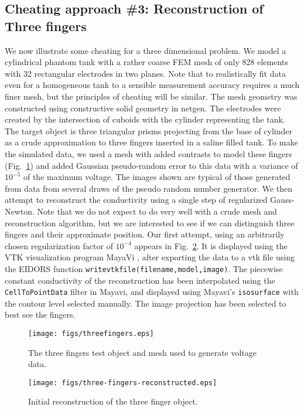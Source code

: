 \documentclass[12pt]{iopart}
\begin{document}
\subsection{
Cheating approach \#3:
     Reconstruction of Three fingers
}
We now illustrate some cheating for a three dimensional
problem. We model a cylindrical phantom tank with a rather
coarse FEM mesh of only 828 elements with 32 rectangular
electrodes in two planes. Note that to realistically
fit data even for a homogeneous tank to a sensible
measurement accuracy requires a much finer mesh, but the
principles of cheating will be similar. The mesh geometry
was constructed using constructive solid geometry in
netgen. The electrodes were created by the intersection
of cuboids with the cylinder representing the tank. The
target object is three triangular prisms projecting from
the base of cylinder as a crude approximation to three
fingers inserted in a saline filled tank. To make the
simulated data, we used a mesh with added contrasts to model
these fingers
(Fig.~\ref{fig:threefingers}) and added Gaussian pseudo-random
error to this data with a variance of $10^{-5}$ of the maximum
voltage. The images shown are typical of those generated
from data from several draws of the pseudo random number
generator. We then attempt to reconstruct the conductivity
using a single step of regularized Gauss-Newton. Note that we do not expect to do
very well with a crude mesh and reconstruction algorithm,
but we are interested to see if we can distinguish three
fingers and their approximate position. Our first attempt,
using an arbitrarily chosen regularization factor
of $10^{-4}$ appears in Fig.~\ref{fig:3fingers1}. It is
displayed using the VTK visualization program MayaVi
\cite{Ramachandran_2003}, after exporting the data to a vtk file
using the EIDORS function {\tt writevtkfile(filename,model,image)}. The
piecewise constant conductivity of the reconstruction has
been interpolated using the {\tt CellToPointData} filter in
Mayavi, and displayed using Mayavi's {\tt isosurface} with
the contour level selected manually. The image projection
has been selected to best see the fingers.

%
%
\begin{figure}[th]
\texttt{[image: figs/threefingers.eps]}
\caption{\label{fig:threefingers}The three fingers test object and mesh used to generate voltage data.}
\end{figure}



%
%
\begin{figure}[th]
\texttt{[image: figs/three-fingers-reconstructed.eps]}
\caption{\label{fig:3fingers1}
Initial reconstruction of the three finger object.}
\end{figure}
\end{document}

